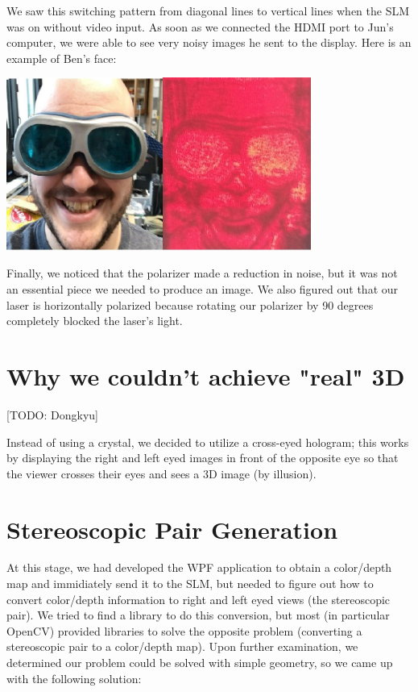 \documentclass[12pt]{article}
\begin{document}
We saw this switching pattern from diagonal lines to vertical lines when the SLM was on without video input. As soon as we connected the HDMI port to Jun's computer, we were able to see very noisy images he sent to the display. Here is an example of Ben's face:

\begin{center}
\includegraphics[width=100mm]{noisy_hologram.jpg}
\end{center}

Finally, we noticed that the polarizer made a reduction in noise, but it was not an essential piece we needed to produce an image. We also figured out that our laser is horizontally polarized because rotating our polarizer by 90 degrees completely blocked the laser's light.

\section{Why we couldn't achieve "real" 3D}

[TODO: Dongkyu]

Instead of using a crystal, we decided to utilize a cross-eyed hologram; this works by displaying the right and left eyed images in front of the opposite eye so that the viewer crosses their eyes and sees a 3D image (by illusion).

\section{Stereoscopic Pair Generation}

At this stage, we had developed the WPF application to obtain a color/depth map and immidiately send it to the SLM, but needed to figure out how to convert color/depth information to right and left eyed views (the stereoscopic pair). We tried to find a library to do this conversion, but most (in particular OpenCV) provided libraries to solve the opposite problem (converting a stereoscopic pair to a color/depth map). Upon further examination, we determined our problem could be solved with simple geometry, so we came up with the following solution:
\end{document}
